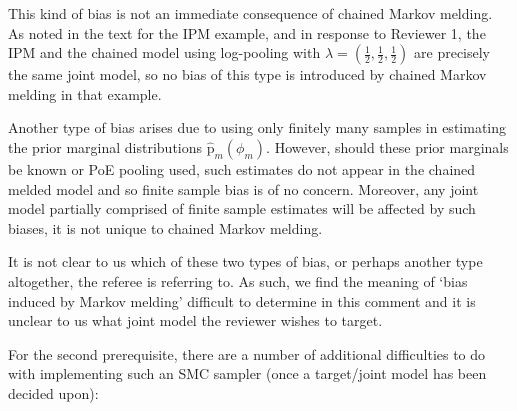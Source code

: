 \documentclass[
  10pt,
  a4paper,
]{article}
\newcommand{\pd}{\text{p}}
\newcommand{\modelindex}{m}
\begin{document}
This kind of bias is not an immediate consequence of chained Markov
melding. As noted in the text for the IPM example, and in response to
Reviewer 1, the IPM and the chained model using log-pooling with
\(\lambda = (\frac{1}{2}, \frac{1}{2}, \frac{1}{2})\) are precisely the
same joint model, so no bias of this type is introduced by chained
Markov melding in that example.

Another type of bias arises due to using only finitely many samples in
estimating the prior marginal distributions
\(\hat{\pd}_{\modelindex}(\phi_{\modelindex})\). However, should these
prior marginals be known or PoE pooling used, such estimates do not
appear in the chained melded model and so finite sample bias is of no
concern. Moreover, any joint model partially comprised of finite sample
estimates will be affected by such biases, it is not unique to chained
Markov melding.

It is not clear to us which of these two types of bias, or perhaps
another type altogether, the referee is referring to. As such, we find
the meaning of `bias induced by Markov melding' difficult to determine
in this comment and it is unclear to us what joint model the reviewer
wishes to target.

For the second prerequisite, there are a number of additional
difficulties to do with implementing such an SMC sampler (once a
target/joint model has been decided upon):
\end{document}
